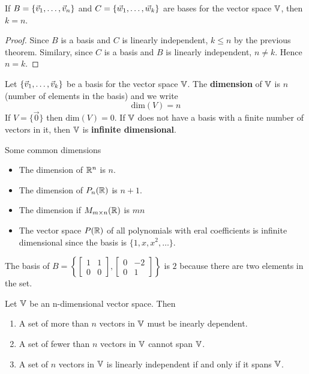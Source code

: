 \documentclass[english, 12pt]{article}
\begin{document}
\begin{thrm}
If $B = \{\vec{v}_1,\dots,\vec{v}_n\}$ and $C = \{ \vec{w}_1,\dots,\vec{w}_k\}$ are bases for the vector space ${\mathbb{V}}$, then $k = n$.

\begin{proof}
Since $B$ is a basis and $C$ is linearly independent, $k \leq n$ by the previous theorem. Similary, since $C$ is a basis and $B$ is linearly independent, $n \neq k$. Hence $n = k$.
\end{proof}
\end{thrm}

\begin{defn}
Let $\{\vec{v}_1,\dots,\vec{v}_k\}$ be a basis for the vector space ${\mathbb{V}}$. The \textbf{dimension} of ${\mathbb{V}}$ is $n$ (number of elements in the basis) and we write
\[\text{dim}(V) = n\]
If $V = \{\vec{0}\}$ then $\text{dim}(V) = 0$. If ${\mathbb{V}}$ does not have a basis with a finite number of vectors in it, then ${\mathbb{V}}$ is \textbf{infinite dimensional}.
\end{defn}

\begin{exmp}
Some common dimensions
\begin{itemize}
\item The dimension of ${\mathbb{R}}^n$ is $n$.
\item The dimension of $P_n({\mathbb{R}})$ is $n+1$.
\item The dimension if $M_{m \times n}({\mathbb{R}})$ is $mn$
\item The vector space $P({\mathbb{R}})$ of all polynomials with eral coefficients is infinite dimensional since the basis is $\{1,x,x^2,\dots\}$.
\end{itemize}
\end{exmp}

\begin{exmp}
The basis of $B = \left\{\begin{bmatrix} 1 & 1 \\ 0 & 0 \end{bmatrix}, \begin{bmatrix} 0 & -2 \\ 0 & 1 \end{bmatrix}\right\}$ is $2$ because there are two elements in the set.
\end{exmp}

\begin{thrm}
Let ${\mathbb{V}}$ be an n-dimensional vector space. Then

\begin{enumerate}
\item A set of more than $n$ vectors in ${\mathbb{V}}$ must be inearly dependent.
\item A set of fewer than $n$ vectors in ${\mathbb{V}}$ cannot span ${\mathbb{V}}$.
\item A set of $n$ vectors in ${\mathbb{V}}$ is linearly independent if and only if it spans ${\mathbb{V}}$.
\end{enumerate}
\end{thrm}
\end{document}
